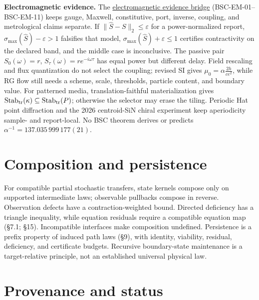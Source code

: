 \documentclass[10pt,a4paper,twocolumn]{extarticle}
\begin{document}
\textbf{Electromagnetic evidence.}
The \href{../framework/Electromagnetic_Evidence_Bridge.md}
{electromagnetic evidence bridge}
(BSC-EM-01--BSC-EM-11) keeps gauge, Maxwell, constitutive, port, inverse,
coupling, and metrological claims separate.  If
\(\lVert\widehat S-S\rVert_2\le\varepsilon\) for a power-normalized report,
\(\sigma_{\max}(\widehat S)-\varepsilon>1\) falsifies that model,
\(\sigma_{\max}(\widehat S)+\varepsilon\le1\) certifies contractivity on the
declared band, and the middle case is inconclusive.  The passive pair
\(S_0(\omega)=r\), \(S_\tau(\omega)=r e^{-i\omega\tau}\) has equal power but
different delay.  Field rescaling and flux quantization do not select the
coupling; revised SI gives \(\mu_0=\alpha\frac{2h}{ce^2}\), while RG flow still
needs a scheme, scale, thresholds, particle content, and boundary value.
For patterned media, translation-faithful materialization gives
\(\operatorname{Stab}_{\rm tr}(\kappa)\subseteq
\operatorname{Stab}_{\rm tr}(P)\); otherwise the selector may erase the
tiling.  Periodic Hat point diffraction and the 2026 centroid-SiN chiral
experiment keep aperiodicity sample- and report-local.
No BSC theorem derives or predicts \(\alpha^{-1}=137.035\,999\,177(21)\).

\section*{Composition and persistence}

For compatible partial stochastic transfers, state kernels compose only on
supported intermediate laws; observable pullbacks compose in reverse.
Observation defects have a contraction-weighted bound.  Directed deficiency
has a triangle inequality, while equation residuals require a compatible
equation map (\S7.1; \S15).  Incompatible interfaces make composition
undefined.
Persistence is a prefix property of induced path laws (\S9), with identity,
viability, residual, deficiency, and certificate budgets.  Recursive
boundary-state maintenance is a target-relative principle, not an established
universal physical law.

\section*{Provenance and status}
\end{document}
